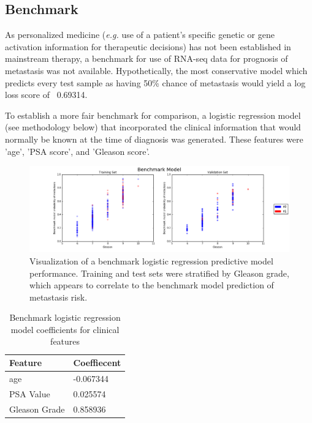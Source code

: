 \documentclass[final]{article}
\begin{document}
\subsection{Benchmark}

As personalized medicine (\textit{e.g.} use of a patient's specific genetic or gene
activation information for therapeutic decisions) has not been established in
mainstream therapy, a benchmark for use of RNA-seq data for prognosis of
metastasis was not available.  Hypothetically, the most conservative model which
predicts every test sample as having 50\% chance of metastasis would yield a log
loss score of ~0.69314.

To establish a more fair benchmark for comparison, a logistic regression model
(see methodology below) that incorporated the clinical information that would
normally be known at the time of diagnosis was generated.  These features were
'age', 'PSA score', and 'Gleason score'.

\begin{figure}[h]
  \centering
  \includegraphics[width=\textwidth]{benchmark}
  \caption{Visualization of a benchmark logistic regression predictive model performance.\label{fig:benchScat}
  Training and test sets were stratified by Gleason grade, which appears to correlate to the benchmark model
  prediction of metastasis risk.}
\end{figure}

\begin{table}
  \centering
  \caption{\label{tab:benchcoefs} Benchmark logistic regression model coefficients for clinical features}
    \begin{tabular}{l l}
      \hline
      Feature & Coeffiecent \\  \hline
      age & -0.067344 \\
      PSA Value & 0.025574 \\
      Gleason Grade & 0.858936 \\
      \hline
    \end{tabular}
  \end{table}
\end{document}
